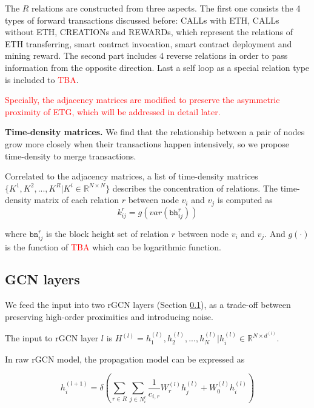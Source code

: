 The $R$ relations are constructed from three aspects. The first one consists the 4 types of forward transactions discussed before: CALLs with ETH, CALLs without ETH, CREATIONs and REWARDs, which represent the relations of ETH transferring, smart contract invocation, smart contract deployment and mining reward. The second part includes 4 reverse relations in order to pass information from the opposite direction. Last a self loop as a special relation type is included to \textcolor{red}{TBA}.

\textcolor{red}{Specially, the adjacency matrices are modified to preserve the asymmetric proximity of ETG, which will be addressed in detail later.}




\textbf{Time-density matrices.} We find that the relationship between a pair of nodes grow more closely when their transactions happen intensively, so we propose time-density to merge transactions.

 Correlated to the adjacency matrices, a list of time-density matrices $\{K^1,K^2,...,K^R|K^i\in \mathbb{R}^{N \times N}\}$ describes the concentration of relations. The time-density matrix of each relation $r$ between node $v_i$ and $v_j$ is computed as%
\begin{equation}
k_{ij}^r=g(var(\texttt{bh}_{ij}^r))
\label{eq:time}
\end{equation}

where $\texttt{bn}_{ij}^{r}$ is the block height set of relation $r$ between node $v_i$ and $v_j$. And $g(\cdot)$ is the function of \textcolor{red}{TBA} which can be logarithmic function.


\subsection{GCN layers}
\label{sec:rGCN layers}
 We feed the input into two rGCN layers (Section \ref{sec:rGCN layers}), as a trade-off between preserving high-order proximities and introducing noise.

The input to rGCN layer $l$ is $H^{(l)}={h_1^{(l)},h_2^{(l)},...,h_N^{(l)}|h_i^{(l)}\in \mathbb{R}^{N \times d^{(l)}}}$.

In raw rGCN model, the propagation model can be expressed as

\begin{equation}
h_i^{(l+1)}=\delta(\sum_{r\in R} \sum_{j \in N_i^r} \frac{1}{c_{i,r}}W_r^{(l)}h_j^{(l)}+W_0^{(l)}h_i^{(l)})
\label{eq:rgcn}
\end{equation}

